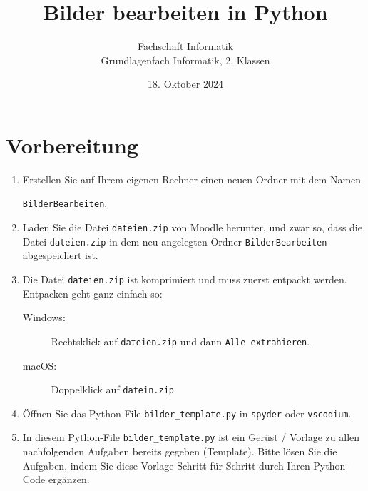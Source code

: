 \newtoggle{withbonus} \toggletrue{withbonus} %

\newcommand{\mycourse}{Grundlagenfach Informatik}
\newcommand{\myclass}{2. Klassen}
\newcommand{\mydate}{18. Oktober 2024}

\title{\textbf{Bilder bearbeiten in Python}}
\author{Fachschaft Informatik\\
	\mycourse, \myclass}
\date{\mydate}
\maketitle
\thispagestyle{headandfoot}
\clearpage

\section*{Vorbereitung}
\begin{enumerate}
	\item Erstellen Sie auf Ihrem eigenen Rechner einen neuen Ordner  mit dem Namen
	      \begin{center}
		      {\tt BilderBearbeiten}.
	      \end{center}
	\item Laden Sie die Datei {\tt dateien.zip} von Moodle herunter, und zwar so, dass die Datei {\tt dateien.zip} in dem neu angelegten Ordner {\tt BilderBearbeiten} abgespeichert ist.
	\item Die Datei {\tt dateien.zip} ist komprimiert und muss zuerst entpackt werden. Entpacken geht ganz einfach so:
	      \begin{description}
		      \item[Windows:] Rechtsklick auf {\tt dateien.zip} und dann {\tt Alle extrahieren}.
		      \item[macOS:] Doppelklick auf {\tt datein.zip}
	      \end{description}
	\item Öffnen Sie das Python-File {\tt bilder\_template.py} in {\tt spyder} oder {\tt vscodium}.
	\item In diesem Python-File {\tt bilder\_template.py} ist ein Gerüst / Vorlage zu allen nachfolgenden Aufgaben bereits gegeben (Template). Bitte lösen Sie die Aufgaben, indem Sie diese Vorlage Schritt für Schritt durch Ihren Python-Code ergänzen.
\end{enumerate}


